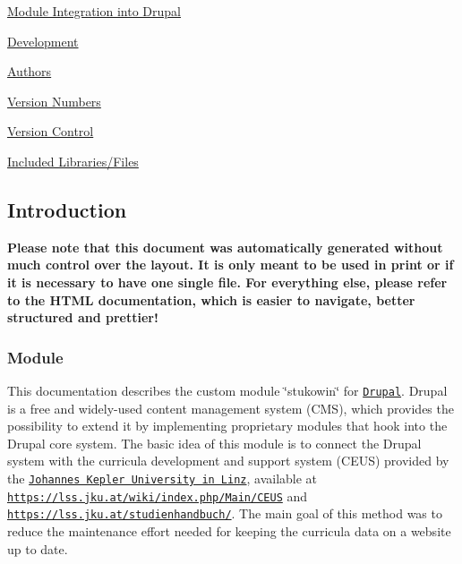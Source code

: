 \begin{DoxyEnumerate}
\begin{DoxyEnumerate}
\item \hyperlink{index_Integration}{Module Integration into Drupal}
\end{DoxyEnumerate}
\item \hyperlink{index_Development}{Development}
\begin{DoxyEnumerate}
\item \hyperlink{index_Authors}{Authors}
\item \hyperlink{index_versionnumbers}{Version Numbers}
\item \hyperlink{index_versioncontrol}{Version Control}
\end{DoxyEnumerate}
\item \hyperlink{index_Included}{Included Libraries/\+Files}
\end{DoxyEnumerate}\hypertarget{index_Introduction}{}\subsection{Introduction}\label{index_Introduction}
 \begin{large}\textrm{\textbf{Please note that this document was automatically generated without much control over the layout. It is only meant to be used in print or if it is necessary to have one single file. For everything else, please refer to the HTML documentation, which is easier to navigate, better structured and prettier!}} \end{large} \hypertarget{index_Module_Intro}{}\subsubsection{Module}\label{index_Module_Intro}
This documentation describes the custom module \char`\"{}stukowin\char`\"{} for \href{http://drupal.org/}{\tt Drupal}. Drupal is a free and widely-\/used content management system (C\+M\+S), which provides the possibility to extend it by implementing proprietary modules that hook into the Drupal core system. The basic idea of this module is to connect the Drupal system with the curricula development and support system (C\+E\+U\+S) provided by the \href{http://jku.at}{\tt Johannes Kepler University in Linz}, available at \href{https://lss.jku.at/wiki/index.php/Main/CEUS}{\tt https\+://lss.\+jku.\+at/wiki/index.\+php/\+Main/\+C\+E\+U\+S} and \href{https://lss.jku.at/studienhandbuch/}{\tt https\+://lss.\+jku.\+at/studienhandbuch/}. The main goal of this method was to reduce the maintenance effort needed for keeping the curricula data on a website up to date.

